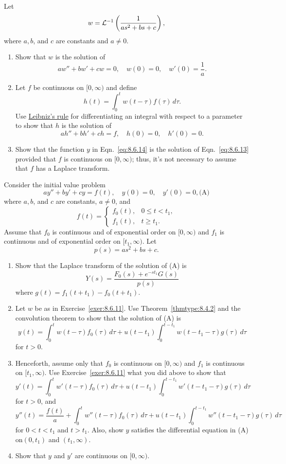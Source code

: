 \documentclass{ximera}
\begin{document}
\begin{problem}\label{exer:8.6.11}
Let
$$
w={\cal L}^{-1}\left(\frac{1}{as^2+bs+c}\right),
$$
where $a,b$, and $c$ are constants and $a\ne0$.
\begin{enumerate}
\item %
Show that $w$ is the solution of
$$
aw''+bw'+cw=0,\quad w(0)=0,\quad w'(0)=\frac{1}{a}.
$$
\item %
Let $f$ be continuous on $[0,\infty)$  and define
$$
h(t)=\int_0^t w(t-\tau)f(\tau)\,d\tau.
$$
Use
\href{http://www-history.mcs.st-and.ac.uk/Mathematicians/Leibniz.html}{Leibniz's rule} for differentiating an integral with
respect to a parameter to show  that $h$ is the solution of
$$
ah''+bh'+ch=f,\quad h(0)=0,\quad h'(0)=0.
$$
\item %
 Show that the function $y$ in  Eqn.~\eqref{eq:8.6.14} is the solution of
Eqn.~\eqref{eq:8.6.13} provided that $f$ is continuous on $[0,\infty)$;
thus, it's not necessary to assume that $f$ has a Laplace transform.
\end{enumerate}
\end{problem}

\begin{problem}\label{exer:8.6.12}
Consider the initial value problem
$$
ay''+by'+cy=f(t),\quad y(0)=0,\quad y'(0)=0,
\text{(A)}
$$
where $a,b$, and $c$ are constants, $a\ne0$, and
$$
f(t)=\left\{\begin{array}{cc}f_0(t),&0\le t<t_1,\\
f_1(t),&t\ge t_1.\end{array}\right.
$$
Assume that $f_0$ is continuous and of exponential order on $[0,\infty)$
and $f_1$ is continuous and of exponential order on $[t_1,\infty)$.
Let
$$
p(s)=as^2+bs+c.
$$
\begin{enumerate}
\item %
Show that the Laplace transform of the solution of  (A)
is
$$
Y(s)=\frac{F_0(s)+e^{-st_1}G(s)}{p(s)}
$$
where  $g(t)=f_1(t+t_1)-f_0(t+t_1)$.
\item %
Let $w$ be as in Exercise~\ref{exer:8.6.11}.
Use Theorem~\ref{thmtype:8.4.2} and the convolution theorem
to show that the solution of (A) is
$$
y(t)=\int_0^t
w(t-\tau)f_0(\tau)\,d\tau+u(t-t_1)\int_0^{t-t_1}
w(t-t_1-\tau)g(\tau)\,d\tau
$$
for $t>0$.
\item %
Henceforth, assume only that $f_0$ is continuous on $[0,\infty)$ and $f_1$
 is continuous on $[t_1,\infty)$.
 Use  Exercise~\ref{exer:8.6.11} what you did above to show that
$$
y'(t)=\int_0^t
w'(t-\tau)f_0(\tau)\,d\tau+u(t-t_1)\int_0^{t-t_1}
w'(t-t_1-\tau)g(\tau)\,d\tau
$$
for $t>0$, and
$$
y''(t)=\frac{f(t)}{a}+\int_0^t
w''(t-\tau)f_0(\tau)\,d\tau+u(t-t_1)\int_0^{t-t_1}
w''(t-t_1-\tau)g(\tau)\,d\tau
$$
for $0<t<t_1$ and $t>t_1$. Also, show
 $y$ satisfies the differential equation in
(A) on$(0,t_1)$ and $(t_1,\infty)$.
\item %
Show that $y$ and $y'$ are continuous on $[0,\infty)$.
\end{enumerate}
\end{problem}
\end{document}
